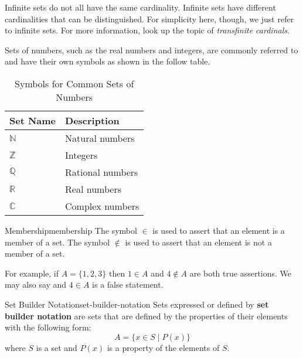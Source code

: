 \begin{advancedTopic}
  Infinite sets do not all have the same cardinality. Infinite sets have different cardinalities
  that can be distinguished. For simplicity here, though, we just refer to infinite sets. For more
  information, look up the topic of \emph{transfinite cardinals}.
\end{advancedTopic}


Sets of numbers, such as the real numbers and integers, are commonly referred to and have
their own symbols as shown in the follow table.
\begin{table}[H]
  \centering
  \begin{tabular}{p{1in} p{2in}}
  \toprule
  \textbf{Set Name} & \textbf{Description} \\
  \midrule
  \(\mathbb{N}\) & Natural numbers \\
  \(\mathbb{Z}\) & Integers \\
  \(\mathbb{Q}\) & Rational numbers \\
  \(\mathbb{R}\) & Real numbers \\
  \(\mathbb{C}\) & Complex numbers \\
  \bottomrule
  \end{tabular}
  \caption{Symbols for Common Sets of Numbers}
\end{table}

\begin{definition}{Membership}{membership}
  The symbol \( \in \) is used to assert that an element is a member of a set.
  The symbol \( \notin \) is used to assert that an element is not a member of a set.
\end{definition}

For example, if \( A = \{ 1, 2, 3 \} \) then \( 1 \in A \) and \( 4 \notin A \) are both 
true assertions. We may also say and \( 4 \in A \) is a false statement.

\begin{definition}{Set Builder Notation}{set-builder-notation}
  Sets expressed or defined by \textbf{set builder notation} are sets that are defined by 
  the properties of their elements with the following form:
  \[ 
    A = \{ x \in S \mid P(x) \} 
  \]
  where \( S \) is a set and \( P(x) \) is a property of the elements of \( S \).
\end{definition}

